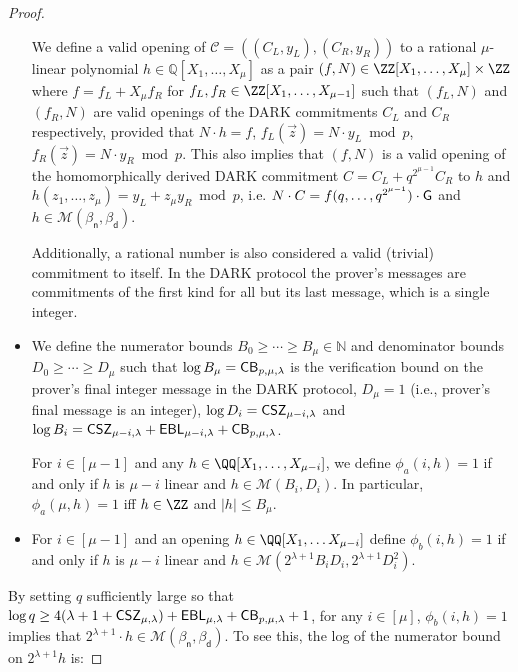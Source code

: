 \begin{proof}
\begin{itemize}
We define a valid opening of $\mathcal{C} = ((C_L, y_L), (C_R, y_R))$ to a rational $\mu$-linear polynomial $h \in \mathbb{Q}[X_1,\dots,X_\mu]$ as a pair $(f, N) \in \ZZ[X_1,\dots,X_\mu] \times \ZZ$ where $f = f_L + X_\mu f_R$ for $f_L, f_R \in \ZZ[X_1,\dots,X_{\mu-1}]$ such that $(f_L, N)$ and $(f_R, N)$ are valid openings of the DARK commitments $C_L$ and $C_R$ respectively, provided that $N \cdot h = f$, $f_L(\vec{z}) = N \cdot y_L \bmod p$, $f_R(\vec{z}) = N \cdot y_R \bmod p$. This also implies that $(f, N)$ is a valid opening of the homomorphically derived DARK commitment $C = C_L + q^{2^{\mu-1}} C_R$ to $h$ and $h(z_1,\dots,z_\mu) = y_L + z_\mu y_R \bmod p$, i.e. $N \cdot C = f(q,\dots,q^{2^{\mu-1}}) \cdot \gr{G}$ and $h \in \mathcal{M}(\beta_\textsf{n}, \beta_\textsf{d})$. %

Additionally, a rational number is also considered a valid (trivial) commitment to itself. In the DARK protocol the prover's messages are commitments of the first kind for all but its last message, which is a single integer. 

\item We define the numerator bounds $B_0\geq \cdots \geq B_\mu \in \mathbb{N}$ and denominator bounds $D_0 \geq \cdots \geq D_\mu$ such that $\log B_\mu = \CorrectnessBound$ is the verification bound on the prover's final integer message in the DARK protocol, $D_\mu = 1$ (i.e., prover's final message is an integer), $\log D_i = \CSZ[\mu - i]$ and $\log B_i = \CSZ[\mu - i] + \EBL[\mu - i] + \CorrectnessBound$. 

For $i \in [\mu-1]$ and any $h \in \QQ[X_1,\dots,X_{\mu-i}]$, we define $\phi_a(i, h) = 1 $ if and only if $h$ is $\mu-i$ linear and $h \in \mathcal{M}(B_i, D_i)$. In particular, $\phi_a(\mu, h) = 1$ iff $h \in \ZZ$ and $|h| \leq B_\mu$. 

\item For $i \in [\mu-1]$ and an opening $h \in \QQ[X_1,\dots X_{\mu-i}]$ define $\phi_b(i, h) = 1$ if and only if $h$ is $\mu-i$ linear and $h \in \mathcal{M}(2^{\lambda + 1} B_i D_i, 2^{\lambda + 1} D_i^2)$. 

\end{itemize}
By setting $q$ sufficiently large so that $\log q \geq 4(\lambda + 1 + \CSZ[\mu]) + \EBL[\mu] + \CorrectnessBound + 1$, for any $i \in [\mu]$, $\phi_b(i, h) = 1$ implies that $2^{\lambda + 1} \cdot h \in \mathcal{M}(\beta_\textsf{n}, \beta_\textsf{d})$. To see this, the log of the numerator bound on $2^{\lambda + 1} h$ is: 


\end{proof}
